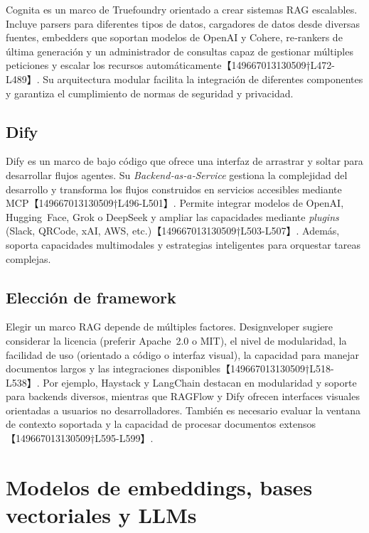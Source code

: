 Cognita es un marco de Truefoundry orientado a crear sistemas RAG escalables.  Incluye parsers para diferentes tipos de datos, cargadores de datos desde diversas fuentes, embedders que soportan modelos de OpenAI y Cohere, re‑rankers de última generación y un administrador de consultas capaz de gestionar múltiples peticiones y escalar los recursos automáticamente【149667013130509†L472-L489】.  Su arquitectura modular facilita la integración de diferentes componentes y garantiza el cumplimiento de normas de seguridad y privacidad.

\subsection{Dify}

Dify es un marco de bajo código que ofrece una interfaz de arrastrar y soltar para desarrollar flujos agentes.  Su \textit{Backend‑as‑a‑Service} gestiona la complejidad del desarrollo y transforma los flujos construidos en servicios accesibles mediante MCP【149667013130509†L496-L501】.  Permite integrar modelos de OpenAI, Hugging Face, Grok o DeepSeek y ampliar las capacidades mediante \textit{plugins} (Slack, QRCode, xAI, AWS, etc.)【149667013130509†L503-L507】.  Además, soporta capacidades multimodales y estrategias inteligentes para orquestar tareas complejas.

\subsection{Elección de framework}

Elegir un marco RAG depende de múltiples factores.  Designveloper sugiere considerar la licencia (preferir Apache 2.0 o MIT), el nivel de modularidad, la facilidad de uso (orientado a código o interfaz visual), la capacidad para manejar documentos largos y las integraciones disponibles【149667013130509†L518-L538】.  Por ejemplo, Haystack y LangChain destacan en modularidad y soporte para backends diversos, mientras que RAGFlow y Dify ofrecen interfaces visuales orientadas a usuarios no desarrolladores.  También es necesario evaluar la ventana de contexto soportada y la capacidad de procesar documentos extensos【149667013130509†L595-L599】.

\section{Modelos de embeddings, bases vectoriales y LLMs}

